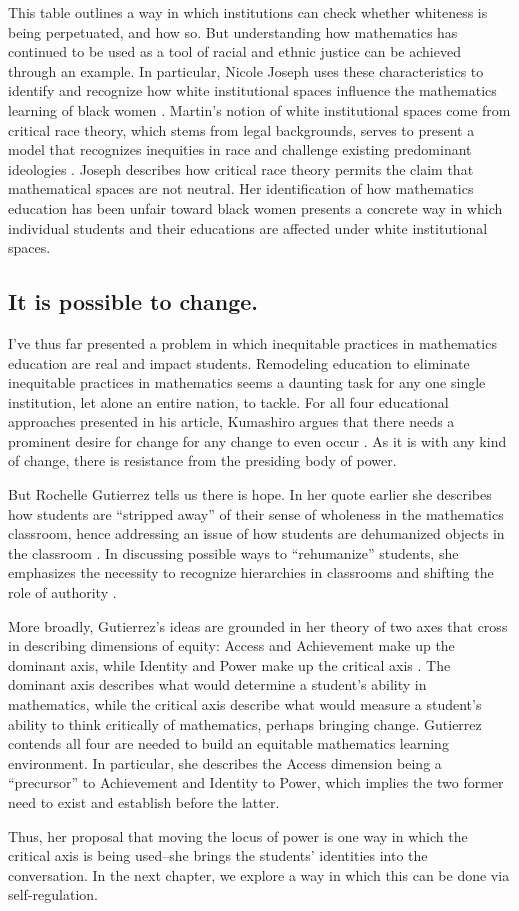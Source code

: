 This table outlines a way in which institutions can check whether whiteness is being perpetuated, and how so. But understanding how mathematics has continued to be used as a tool of racial and ethnic justice can be achieved through an example. In particular, Nicole Joseph uses these characteristics to identify and recognize how white institutional spaces influence the mathematics learning of black women \citep{joseph_black_2017}. Martin's notion of white institutional spaces come from critical race theory, which stems from legal backgrounds, serves to present a model that recognizes inequities in race and challenge existing predominant ideologies \citep{solorzano_critical_2000}. Joseph describes how critical race theory permits the claim that mathematical spaces are not neutral. Her identification of how mathematics education has been unfair toward black women presents a concrete way in which individual students and their educations are affected under white institutional spaces.

\subsection{It is possible to change.}
I've thus far presented a problem in which inequitable practices in mathematics education are real and impact students. Remodeling education to eliminate inequitable practices in mathematics seems a daunting task for any one single institution, let alone an entire nation, to tackle. For all four educational approaches presented in his article, Kumashiro argues that there needs a prominent desire for change for any change to even occur \citep{kumashiro_toward_2000}. As it is with any kind of change, there is resistance from the presiding body of power.

But Rochelle Gutierrez tells us there is hope. In her quote earlier she describes how students are ``stripped away'' of their sense of wholeness in the mathematics classroom, hence addressing an issue of how students are dehumanized objects in the classroom \citep{gutierrez_living_2017}. In discussing possible ways to ``rehumanize'' students, she emphasizes the necessity to recognize hierarchies in classrooms and shifting the role of authority \citep{gutierrez_why_2018}.

More broadly, Gutierrez's ideas are grounded in her theory of two axes that cross in describing dimensions of equity: Access and Achievement make up the dominant axis, while Identity and Power make up the critical axis \citep{gutierrez_2009}. The dominant axis describes what would determine a student's ability in mathematics, while the critical axis describe what would measure a student's ability to think critically of mathematics, perhaps bringing change. Gutierrez contends all four are needed to build an equitable mathematics learning environment. In particular, she describes the Access dimension being a ``precursor'' to Achievement and Identity to Power, which implies the two former need to exist and establish before the latter.

Thus, her proposal that moving the locus of power is one way in which the critical axis is being used--she brings the students' identities into the conversation. In the next chapter, we explore a way in which this can be done via self-regulation.
